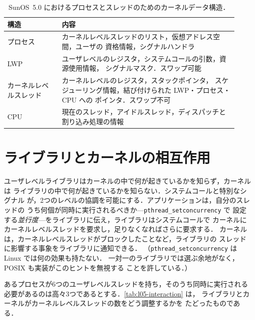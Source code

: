 \documentclass[../main.tex]{subfiles}
\begin{document}
\begin{table}[htbp]
  \centering
  \caption{SunOS~5.0 におけるプロセスとスレッドのためのカーネルデータ構造．}
  \label{tab:l05-kernel-structs}
  \small
  \begin{tabular}{@{}>{\raggedright\arraybackslash}p{0.22\linewidth}>{\raggedright\arraybackslash}p{0.71\linewidth}@{}}
    \toprule
    構造 & 内容 \\
    \midrule
    プロセス & カーネルレベルスレッドのリスト，仮想アドレス空間，ユーザの
      資格情報，シグナルハンドラ \\
    LWP & ユーザレベルのレジスタ，システムコールの引数，資源使用情報，
      シグナルマスク．スワップ可能 \\
    カーネルレベルスレッド & カーネルレベルのレジスタ，スタックポインタ，
      スケジューリング情報，結び付けられた LWP・プロセス・CPU への
      ポインタ．スワップ不可 \\
    CPU & 現在のスレッド，アイドルスレッド，ディスパッチと
      割り込み処理の情報 \\
    \bottomrule
  \end{tabular}
\end{table}

\section{ライブラリとカーネルの相互作用}
\label{sec:l05-interaction}

ユーザレベルライブラリはカーネルの中で何が起きているかを知らず，カーネルは
ライブラリの中で何が起きているかを知らない．システムコールと特別なシグナル
が，2つのレベルの協調を可能にする．アプリケーションは，自分のスレッドの
うち何個が同時に実行されるべきか---\texttt{pthread\_setconcurrency} で
設定する\emph{並行度}---をライブラリに伝え，ライブラリはシステムコールで
カーネルにカーネルレベルスレッドを要求し，足りなくなればさらに要求する．
カーネルは，カーネルレベルスレッドがブロックしたことなど，ライブラリの
スレッドに影響する事象をライブラリに通知できる．
（\texttt{pthread\_setconcurrency} は Linux では何の効果も持たない．
一対一のライブラリでは選ぶ余地がなく，POSIX も実装がこのヒントを無視する
ことを許している．）

\begin{example}
  あるプロセスが6つのユーザレベルスレッドを持ち，そのうち同時に実行される
  必要があるのは高々3つであるとする．\cref{tab:l05-interaction} は，
  ライブラリとカーネルがカーネルレベルスレッドの数をどう調整するかを
  たどったものである．
\end{example}
\end{document}

